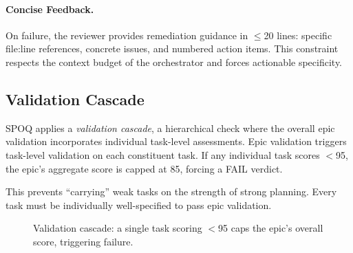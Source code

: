 \paragraph{Concise Feedback.}
On failure, the reviewer provides remediation guidance in $\leq$20 lines:
specific file:line references, concrete issues, and numbered action items.
This constraint respects the context budget of the orchestrator and forces
actionable specificity.

\newpage
\subsection{Validation Cascade}
\label{subsec:validation-cascade}

SPOQ applies a \textit{validation cascade}, a hierarchical check where the
overall epic validation incorporates individual task-level assessments.
Epic validation triggers task-level validation on each constituent task.
If any individual task scores $<$95, the epic's aggregate score is capped
at 85, forcing a FAIL verdict.

This prevents ``carrying'' weak tasks on the strength of strong planning.
Every task must be individually well-specified to pass epic validation.

\begin{figure}[htbp]
\centering
{}
\caption{Validation cascade: a single task scoring $<$95 caps the epic's
overall score, triggering failure.}
\label{fig:cascade}
\end{figure}
